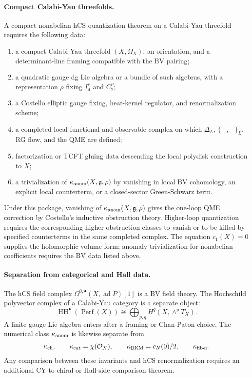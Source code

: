 \paragraph{Compact Calabi-Yau threefolds.}
A compact nonabelian hCS quantization theorem on a Calabi-Yau threefold
requires the following data:
\begin{enumerate}
\item a compact Calabi-Yau threefold \((X,\Omega_X)\), an orientation,
and a determinant-line framing compatible with the BV pairing;
\item a quadratic gauge dg Lie algebra or a bundle of such algebras,
with a representation \(\rho\) fixing \(I_4^\rho\) and \(C_2^\rho\);
\item a Costello elliptic gauge fixing, heat-kernel regulator, and
renormalization scheme;
\item a completed local functional and observable complex on which
\(\Delta_L\), \(\{-,-\}_L\), RG flow, and the QME are defined;
\item factorization or TCFT gluing data descending the local polydisk
construction to \(X\);
\item a trivialization of \(\kappa_{\mathrm{anom}}(X,\mathfrak{g},\rho)\) by vanishing in local
BV cohomology, an explicit local counterterm, or a closed-sector
Green-Schwarz term.
\end{enumerate}
Under this package, vanishing of \(\kappa_{\mathrm{anom}}(X,\mathfrak{g},\rho)\) gives the
one-loop QME correction by Costello's inductive obstruction theory.
Higher-loop quantization requires the corresponding higher obstruction
classes to vanish or to be killed by specified counterterms in the same
completed complex.  The equation \(c_1(X)=0\) supplies the holomorphic
volume form; anomaly trivialization for nonabelian coefficients requires
the BV data listed above.

\paragraph{Separation from categorical and Hall data.}
The hCS field complex
\(\Omega^{0,\bullet}(X,\operatorname{ad}P)[1]\) is a BV field theory.
The Hochschild polyvector complex of a Calabi-Yau category is a separate
object:
\[
  \operatorname{HH}^\bullet(\operatorname{Perf}(X))
  \cong
  \bigoplus_{p,q}H^q(X,\wedge^pT_X).
\]
A finite gauge Lie algebra enters after a framing or Chan-Paton choice.
The numerical class \(\kappa_{\mathrm{anom}}\) is likewise separate from
\[
  \kappa_{\mathrm{ch}},\qquad
  \kappa_{\mathrm{cat}}=\chi(\mathcal{O}_X),\qquad
  \kappa_{\mathrm{BKM}}=c_N(0)/2,\qquad
  \kappa_{\mathrm{fiber}} .
\]
Any comparison between these invariants and hCS renormalization requires
an additional CY-to-chiral or Hall-side comparison theorem.

